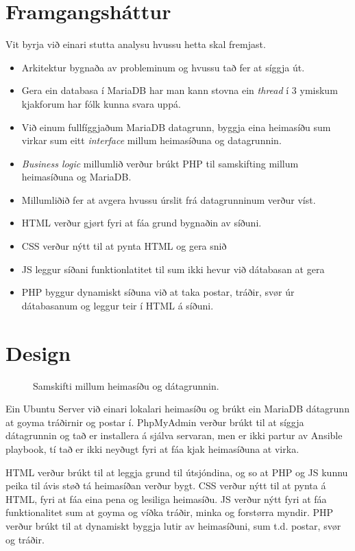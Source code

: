 \documentclass{article}
\begin{document}
\section{Framgangsháttur}
\par Vit byrja við einari stutta analysu hvussu hetta skal fremjast.
\begin{itemize}
    \item Arkitektur bygnaða av probleminum og hvussu tað fer at síggja út.
    \item Gera ein databasa í MariaDB har man kann stovna ein \textit{thread} í 3 ymiskum kjakforum har fólk kunna svara uppá.
    \item Við einum fullfíggjaðum MariaDB datagrunn, byggja eina heimasíðu sum virkar sum eitt \textit{interface} millum heimasíðuna og datagrunnin.
    \item \textit{Business logic} millumlið verður brúkt PHP til samskifting millum
            \newline heimasíðuna og MariaDB.
    \item Millumliðið fer at avgera hvussu úrslit frá datagrunninum verður víst.    
\end{itemize}

\begin{itemize}
    \item HTML verður gjørt fyri at fáa grund bygnaðin av síðuni.
    \item CSS verður nýtt til at pynta HTML og gera snið
    \item JS leggur síðani funktionlatitet til sum ikki hevur við dátabasan at gera
    \item PHP byggur dynamiskt síðuna við at taka postar, tráðir, svør úr dátabasanum
og leggur teir í HTML á síðuni.
\end{itemize}


\section{Design}
\begin{figure}[H]
    \centering
     
    \caption{Samskifti millum heimasíðu og dátagrunnin.}
    \label{fig:html-cs-db.svg}
\end{figure}

\par Ein Ubuntu Server við einari lokalari heimasíðu og brúkt ein MariaDB dátagrunn
at goyma tráðirnir og postar í.
PhpMyAdmin verður brúkt til at síggja dátagrunnin og tað er installera á sjálva servaran,
men er ikki partur av Ansible playbook, tí tað er ikki neyðugt fyri at fáa kjak heimasíðuna
at virka.
\par HTML verður brúkt til at leggja grund til útsjóndina, og so at PHP og JS kunnu peika
til ávis støð tá heimasíðan verður bygt. CSS verður nýtt til at pynta á HTML, fyri at fáa eina
pena og lesiliga heimasíðu. JS verður nýtt fyri at fáa funktionalitet sum at goyma og víðka
tráðir, minka og forstørra myndir. PHP verður brúkt til at dynamiskt byggja lutir av
heimasíðuni, sum t.d. postar, svør og tráðir.
\end{document}
